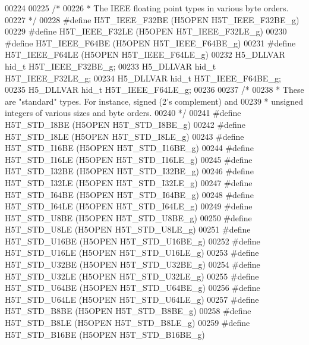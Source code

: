 \begin{DoxyCode}
00224 
00225 \textcolor{comment}{/*}
00226 \textcolor{comment}{ * The IEEE floating point types in various byte orders.}
00227 \textcolor{comment}{ */}
00228 \textcolor{preprocessor}{#define H5T\_IEEE\_F32BE      (H5OPEN H5T\_IEEE\_F32BE\_g)}
00229 \textcolor{preprocessor}{#define H5T\_IEEE\_F32LE      (H5OPEN H5T\_IEEE\_F32LE\_g)}
00230 \textcolor{preprocessor}{#define H5T\_IEEE\_F64BE      (H5OPEN H5T\_IEEE\_F64BE\_g)}
00231 \textcolor{preprocessor}{#define H5T\_IEEE\_F64LE      (H5OPEN H5T\_IEEE\_F64LE\_g)}
00232 H5\_DLLVAR hid\_t H5T\_IEEE\_F32BE\_g;
00233 H5\_DLLVAR hid\_t H5T\_IEEE\_F32LE\_g;
00234 H5\_DLLVAR hid\_t H5T\_IEEE\_F64BE\_g;
00235 H5\_DLLVAR hid\_t H5T\_IEEE\_F64LE\_g;
00236 
00237 \textcolor{comment}{/*}
00238 \textcolor{comment}{ * These are "standard" types.  For instance, signed (2's complement) and}
00239 \textcolor{comment}{ * unsigned integers of various sizes and byte orders.}
00240 \textcolor{comment}{ */}
00241 \textcolor{preprocessor}{#define H5T\_STD\_I8BE        (H5OPEN H5T\_STD\_I8BE\_g)}
00242 \textcolor{preprocessor}{#define H5T\_STD\_I8LE        (H5OPEN H5T\_STD\_I8LE\_g)}
00243 \textcolor{preprocessor}{#define H5T\_STD\_I16BE       (H5OPEN H5T\_STD\_I16BE\_g)}
00244 \textcolor{preprocessor}{#define H5T\_STD\_I16LE       (H5OPEN H5T\_STD\_I16LE\_g)}
00245 \textcolor{preprocessor}{#define H5T\_STD\_I32BE       (H5OPEN H5T\_STD\_I32BE\_g)}
00246 \textcolor{preprocessor}{#define H5T\_STD\_I32LE       (H5OPEN H5T\_STD\_I32LE\_g)}
00247 \textcolor{preprocessor}{#define H5T\_STD\_I64BE       (H5OPEN H5T\_STD\_I64BE\_g)}
00248 \textcolor{preprocessor}{#define H5T\_STD\_I64LE       (H5OPEN H5T\_STD\_I64LE\_g)}
00249 \textcolor{preprocessor}{#define H5T\_STD\_U8BE        (H5OPEN H5T\_STD\_U8BE\_g)}
00250 \textcolor{preprocessor}{#define H5T\_STD\_U8LE        (H5OPEN H5T\_STD\_U8LE\_g)}
00251 \textcolor{preprocessor}{#define H5T\_STD\_U16BE       (H5OPEN H5T\_STD\_U16BE\_g)}
00252 \textcolor{preprocessor}{#define H5T\_STD\_U16LE       (H5OPEN H5T\_STD\_U16LE\_g)}
00253 \textcolor{preprocessor}{#define H5T\_STD\_U32BE       (H5OPEN H5T\_STD\_U32BE\_g)}
00254 \textcolor{preprocessor}{#define H5T\_STD\_U32LE       (H5OPEN H5T\_STD\_U32LE\_g)}
00255 \textcolor{preprocessor}{#define H5T\_STD\_U64BE       (H5OPEN H5T\_STD\_U64BE\_g)}
00256 \textcolor{preprocessor}{#define H5T\_STD\_U64LE       (H5OPEN H5T\_STD\_U64LE\_g)}
00257 \textcolor{preprocessor}{#define H5T\_STD\_B8BE        (H5OPEN H5T\_STD\_B8BE\_g)}
00258 \textcolor{preprocessor}{#define H5T\_STD\_B8LE        (H5OPEN H5T\_STD\_B8LE\_g)}
00259 \textcolor{preprocessor}{#define H5T\_STD\_B16BE       (H5OPEN H5T\_STD\_B16BE\_g)}

\end{DoxyCode}
